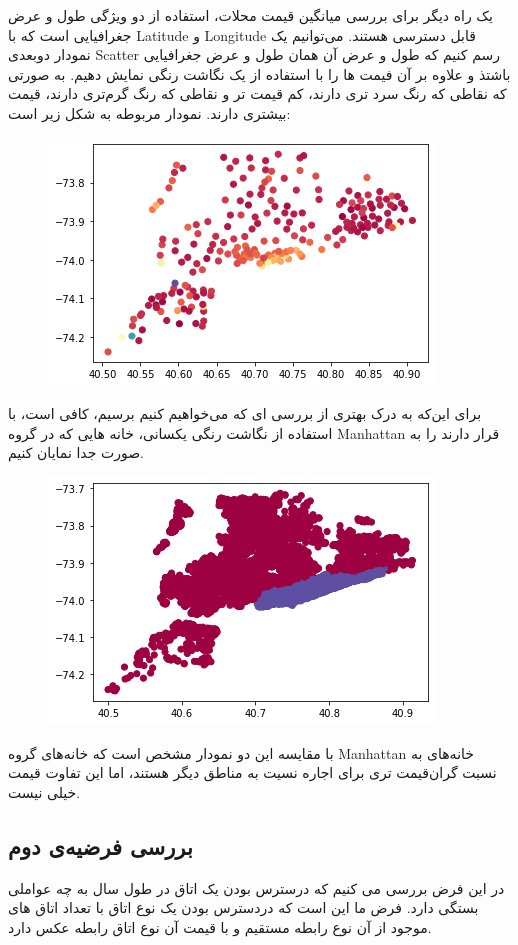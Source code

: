 \documentclass[table]{article}
\begin{document}
	یک راه دیگر برای بررسی میانگین قیمت محلات، استفاده از دو ویژگی طول و عرض جغرافیایی است که با Latitude و Longitude قابل دسترسی هستند. می‌توانیم یک نمودار دوبعدی Scatter رسم کنیم که طول و عرض آن همان طول و عرض جغرافیایی باشتذ و علاوه بر آن فیمت ها را با استفاده از یک نگاشت رنگی نمایش دهیم. به صورتی که نقاطی که رنگ سرد تری دارند، کم قیمت تر و نقاطی که رنگ گرم‌تری دارند، قیمت بیشتری دارند. نمودار مربوطه به شکل زیر است:
	\begin{figure}[h!]
		\centering
		\includegraphics[scale=.5]{./graph4.png}
		\caption{}
	\end{figure}

	برای این‌که به درک بهتری از بررسی ای که می‌خواهیم کنیم برسیم، کافی است، با استفاده از نگاشت رنگی یکسانی‌، خانه هایی که در گروه Manhattan قرار دارند را به صورت جدا نمایان کنیم.
	
	\begin{figure}[h!]
		\centering
		\includegraphics[scale=.5]{./graph5.png}
		\caption{}
	\end{figure}
	
	با مقایسه این دو نمودار مشخص است که خانه‌های گروه Manhattan خانه‌های به نسبت گران‌قیمت تری برای اجاره نسیت به مناطق دیگر هستند، اما این تفاوت قیمت خیلی نیست.
	
	\subsection{بررسی فرضیه‌ی دوم}
	در این فرض بررسی می کنیم که درسترس بودن یک اتاق در طول سال به چه عواملی بستگی دارد. فرض ما این است که دردسترس بودن یک نوع اتاق با تعداد اتاق های موجود  از آن نوع رابطه مستقیم و با قیمت آن نوع اتاق رابطه عکس دارد.
	
\end{document}
